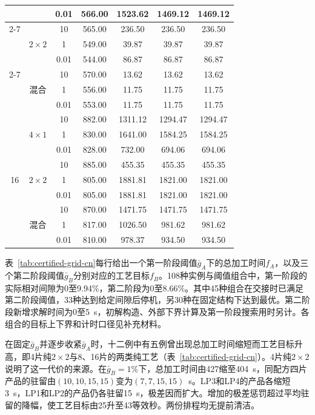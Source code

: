 \documentclass[final,5p,times,twocolumn]{elsarticle}
\begin{document}
\begin{table}[!t]
\begin{tabular}{@{}ccccccc@{}}
 &  & 0.01 & 566.00 & 1523.62 & 1469.12 & 1469.12\\
\cmidrule(l){2-7}
 & \multirow{3}{*}{$2\times2$} & 10 & 565.00 & 236.50 & 236.50 & 236.50\\
 &  & 1 & 549.00 & 39.87 & 39.87 & 39.87\\
 &  & 0.01 & 544.00 & 86.87 & 86.87 & 86.87\\
\cmidrule(l){2-7}
 & \multirow{3}{*}{混合} & 10 & 570.00 & 13.62 & 13.62 & 13.62\\
 &  & 1 & 556.00 & 11.75 & 11.75 & 11.75\\
 &  & 0.01 & 553.00 & 11.75 & 11.75 & 11.75\\
\midrule
\multirow{9}{*}{16} & \multirow{3}{*}{$4\times1$} & 10 & 882.00 & 1311.12 & 1294.47 & 1294.47\\
 &  & 1 & 830.00 & 1641.00 & 1584.25 & 1584.25\\
 &  & 0.01 & 828.00 & 732.00 & 694.06 & 694.06\\
\cmidrule(l){2-7}
 & \multirow{3}{*}{$2\times2$} & 10 & 885.00 & 455.35 & 455.35 & 455.35\\
 &  & 1 & 805.00 & 1881.81 & 1821.00 & 1821.00\\
 &  & 0.01 & 805.00 & 1881.81 & 1821.00 & 1821.00\\
\cmidrule(l){2-7}
 & \multirow{3}{*}{混合} & 10 & 870.00 & 1471.75 & 1471.75 & 1471.75\\
 &  & 1 & 817.00 & 1026.50 & 981.62 & 981.62\\
 &  & 0.01 & 810.00 & 978.37 & 934.50 & 934.50\\
\bottomrule
\end{tabular}
\end{table}

表~\ref{tab:certified-grid-cn}每行给出一个第一阶段阈值$\bar g_A$下的总加工时间$f_A$，以及三个第二阶段阈值$\bar g_B$分别对应的工艺目标$f_B$。108种实例与阈值组合中，第一阶段的实际相对间隙为0至9.94\%，第二阶段为0至8.66\%。其中45种组合在交接时已满足第二阶段阈值，33种达到给定间隙后停机，另30种在固定结构下达到最优。第二阶段新增求解时间为0至5~s，初解构造、外部下界计算及第一阶段搜索用时另计。各组合的目标上下界和计时口径见补充材料。

在固定$\bar g_B$并逐步收紧$\bar g_A$时，十二例中有五例曾出现总加工时间缩短而工艺目标升高，即4片纯$2\times2$与8、16片的两类纯工艺（表~\ref{tab:certified-grid-cn}）。4片纯$2\times2$说明了这一代价的来源。在$\bar g_B=1\%$下，总加工时间由427缩至404~s，同配方四片产品的驻留由$(10,10,15,15)$变为$(7,7,15,15)$~s。LP3和LP4的产品各缩短3~s，LP1和LP2的产品仍各驻留15~s，极差因而扩大。增加的极差惩罚超过平均驻留的降幅，使工艺目标由25升至43等效秒。两份排程均无提前清洁。
\end{document}
